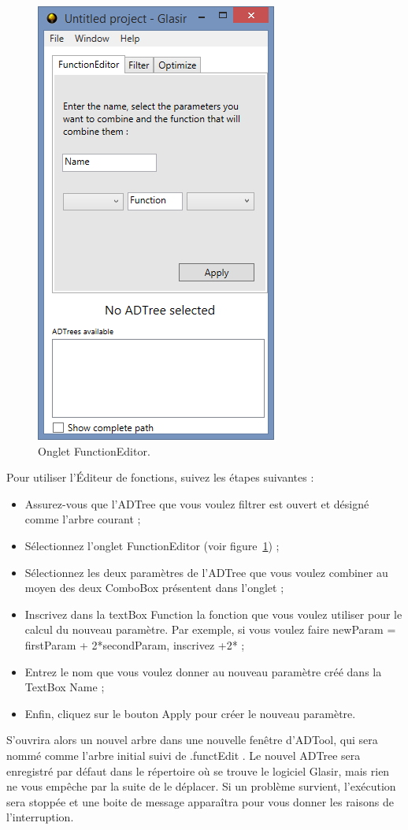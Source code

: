  \begin{figure}[H]
        \centering
        \includegraphics[height=0.7\textwidth]{figure/functionEdition.png}
        \caption{Onglet FunctionEditor.}
        \label{fig:functEdit}
    \end{figure}

Pour utiliser l'Éditeur de fonctions, suivez les étapes suivantes : 

\begin{itemize}
\item Assurez-vous que l'ADTree que vous voulez filtrer est ouvert et désigné comme l'arbre courant ;
\item Sélectionnez l'onglet \og FunctionEditor \fg{} (voir {\sc figure}~\ref{fig:functEdit}) ;
\item Sélectionnez les deux paramètres de l'ADTree que vous voulez combiner au moyen des deux ComboBox présentent dans l'onglet ;
\item Inscrivez dans la textBox \og Function \fg{} la fonction que vous voulez utiliser pour le calcul du nouveau paramètre. Par exemple, si vous voulez faire \og newParam = firstParam + 2*secondParam\fg , inscrivez \og +2* \fg{} ;
\item Entrez le nom que vous voulez donner au nouveau paramètre créé dans la TextBox \og Name \fg{} ;
\item Enfin, cliquez sur le bouton \og Apply\fg{} pour créer le nouveau paramètre.
\end{itemize} 

S'ouvrira alors un nouvel arbre dans une nouvelle fenêtre d'ADTool, qui sera nommé comme l'arbre initial suivi de \og .functEdit \fg{} . Le nouvel ADTree sera enregistré par défaut dans le répertoire où se trouve le logiciel Glasir, mais rien ne vous empêche par la suite de le déplacer. 
Si un problème survient, l'exécution sera stoppée et une boite de message apparaîtra pour vous donner les raisons de l'interruption.

